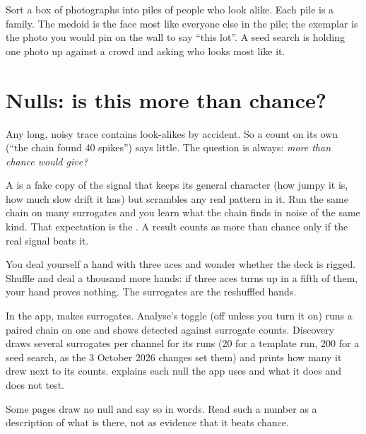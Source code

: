 \begin{plainterms}
Sort a box of photographs into piles of people who look alike. Each pile is a family. The
medoid is the face most like everyone else in the pile; the exemplar is the photo you would
pin on the wall to say ``this lot''. A seed search is holding one photo up against a crowd
and asking who looks most like it.
\end{plainterms}

\section{Nulls: is this more than chance?}\label{sec:core-ideas-nulls}
Any long, noisy trace contains look-alikes by accident. So a count on its own (``the chain
found 40 spikes'') says little. The question is always: \emph{more than chance would give?}

A  is a fake copy of the signal that keeps its general character
(how jumpy it is, how much slow drift it has) but scrambles any real pattern in it. Run the
same chain on many surrogates and you learn what the chain finds in noise of the same kind.
That expectation is the . A result counts as more than chance only if the
real signal beats it.

\begin{plainterms}
You deal yourself a hand with three aces and wonder whether the deck is rigged. Shuffle and
deal a thousand more hands: if three aces turns up in a fifth of them, your hand proves
nothing. The surrogates are the reshuffled hands.
\end{plainterms}

In the app,  makes surrogates. Analyse's  toggle (off unless you turn it on) runs a paired chain on one and shows detected
against surrogate counts. Discovery draws several surrogates per channel for its runs (20 for a template run, 200 for
a seed search, as the 3 October 2026 changes set them) and prints how many it drew next to
its counts.  explains each null the app
uses and what it does and does not test.

\begin{watchout}
Some pages draw no null and say so in words. Read such a number as a description of what is
there, not as evidence that it beats chance.
\end{watchout}

